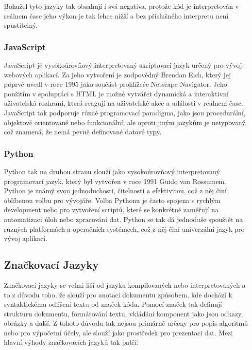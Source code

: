 Bohužel tyto jazyky tak obsahují i svá negativa, protože kód je interpretován v reálnem čase jeho výkon je tak lehce nižší a bez příslušného interpretu není spustitelný.

\subsubsection{JavaScript}
\label{subsubsec:languages-interpreted-javascript}
JavaScript je vysokoúrovňový interpretovaný skriptovací jazyk určený pro vývoj webových aplikací. Za jeho vytvoření je zodpovědný Brendan Eich, který jej poprvé uvedl v roce 1995 jako součást prohlížeče Netscape Navigator. Jeho použitím v spolupráci s HTML je možné vytvářet dynamická a interaktivní uživatelská rozhraní, která reagují na uživatelské akce a události v reálnem čase. JavaScript tak podporuje různé programovací paradigma, jako jsou procedurální, objektově orientované nebo funkcionální, ale oproti jiným jazykům je netypovaný, což znamená, že nemá pevně definované datové typy.

\subsubsection{Python}
\label{subsubsec:languages-interpreted-python}
Python tak na druhou stranu slouží jako vysokoúrovňový interpretovaný programovací jazyk, který byl vytvořen v roce 1991 Guido van Rossumem. Python je známý svou jednoduchostí, čitelností a efektivitou, což z něj činí oblíbenou volbu pro vývojáře. Volba Pythonu je často spojena s rychlým development nebo pro vytvoření scriptů, které se konkrétně zaměřují na automatizaci úloh nebo zpracování dat. Python se tak dá jednoduše spouštět na různých platformách a operačních systémech, což z něj činí univerzální jazyk pro vývoj aplikací.

\subsection{Značkovací Jazyky}
\label{subsec:languages-markup}
Značkovací jazyky se velmi liší od jazyku kompilovaných nebo interpretovaných a to z důvodu toho, že slouží pro anotaci dokumentu způsobem, kde dochází k syntaktickému odlišení textu od značek kódu. Pomocí značek tak definují strukturu dokumentu, formátování textu, vkládání komponent jako jsou odkazy, obrázky a další. Z tohoto důvodu tak nejsou primárně určeny pro popis algoritmů nebo pro výpočetní účely, ale slouží jako prostředek pro prezentaci dat. Mezi hlavní výhody značkovacích jazyků tak patří:

